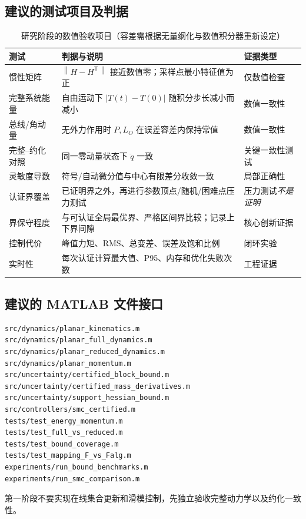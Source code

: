 \documentclass[journal,onecolumn]{IEEEtran}
\newcommand{\norm}[1]{\left\lVert#1\right\rVert}
\newcommand{\tr}{\mathsf T}
\begin{document}
\subsection{建议的测试项目及判据}
\begin{table}[htbp]\centering\caption{研究阶段的数值验收项目（容差需根据无量纲化与数值积分器重新设定）}
\begin{tabular}{p{.25\linewidth}p{.45\linewidth}p{.21\linewidth}}\toprule
测试&判据与说明&证据类型\\\midrule
惯性矩阵&$\norm{H-H^\tr}$ 接近数值零；采样点最小特征值为正&仅数值检查\\
完整系统能量&自由运动下 $|T(t)-T(0)|$ 随积分步长减小而减小&数值一致性\\
总线/角动量&无外力作用时 $P,L_O$ 在误差容差内保持常值&数值一致性\\
完整--约化对照&同一零动量状态下 $\ddot q$ 一致&关键一致性测试\\
灵敏度导数&符号/自动微分值与中心有限差分收敛一致&局部正确性\\
认证界覆盖&已证明界之外，再进行参数顶点/随机/困难点压力测试&压力测试\emph{不是证明}\\
界保守程度&与可认证全局最优界、严格区间界比较；记录上下界间隙&核心创新证据\\
控制代价&峰值力矩、RMS、总变差、误差及饱和比例&闭环实验\\
实时性&每次认证计算最大值、P95、内存和优化失败次数&工程证据\\\bottomrule
\end{tabular}\end{table}

\subsection{建议的 MATLAB 文件接口}
\begin{verbatim}
src/dynamics/planar_kinematics.m
src/dynamics/planar_full_dynamics.m
src/dynamics/planar_reduced_dynamics.m
src/dynamics/planar_momentum.m
src/uncertainty/certified_block_bound.m
src/uncertainty/certified_mass_derivatives.m
src/uncertainty/support_hessian_bound.m
src/controllers/smc_certified.m
tests/test_energy_momentum.m
tests/test_full_vs_reduced.m
tests/test_bound_coverage.m
tests/test_mapping_F_vs_Falg.m
experiments/run_bound_benchmarks.m
experiments/run_smc_comparison.m
\end{verbatim}
第一阶段不要实现在线集合更新和滑模控制，先独立验收完整动力学以及约化一致性。
\end{document}

